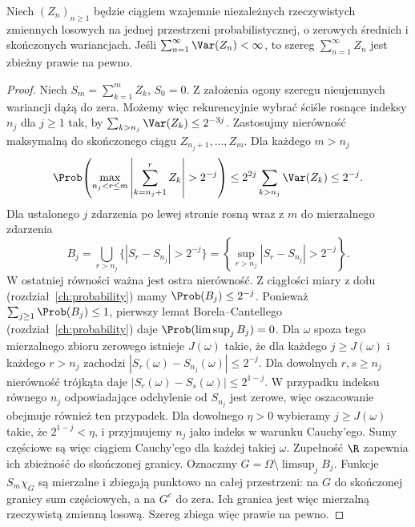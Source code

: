 \begin{lemat}
Niech $(Z_n)_{n\geq1}$ będzie ciągiem wzajemnie
niezależnych rzeczywistych zmiennych losowych na jednej
przestrzeni probabilistycznej, o zerowych średnich
i skończonych wariancjach. Jeśli $\sum_{n=1}^\infty\Var(Z_n)<\infty$,
to szereg $\sum_{n=1}^\infty Z_n$ jest zbieżny
prawie na pewno.
\end{lemat}
\begin{proof}
Niech $S_m=\sum_{k=1}^m Z_k$, $S_0=0$.
Z założenia ogony szeregu nieujemnych wariancji
dążą do zera. Możemy więc rekurencyjnie wybrać
ściśle rosnące indeksy $n_j$ dla $j\geq1$ tak, by
$\sum_{k>n_j}\Var(Z_k)\leq2^{-3j}$.
Zastosujmy nierówność maksymalną do skończonego
ciągu $Z_{n_j+1},\ldots,Z_m$. Dla każdego $m>n_j$
\[
\Prob\!\left(\max_{n_j<r\leq m}
\left|\sum_{k=n_j+1}^rZ_k\right|>2^{-j}\right)
\leq 2^{2j}\sum_{k>n_j}\Var(Z_k)\leq2^{-j}.
\]
Dla ustalonego $j$ zdarzenia po lewej stronie
rosną wraz z $m$ do mierzalnego zdarzenia
\[
B_j=\bigcup_{r>n_j}\{|S_r-S_{n_j}|>2^{-j}\}
=\left\{\sup_{r>n_j}|S_r-S_{n_j}|>2^{-j}\right\}.
\]
W ostatniej równości ważna jest ostra nierówność.
Z ciągłości miary z dołu (rozdział~\ref{ch:probability})
mamy $\Prob(B_j)\leq2^{-j}$.
Ponieważ $\sum_{j\geq1}\Prob(B_j)\leq1$, pierwszy
lemat Borela--Cantellego (rozdział~\ref{ch:probability})
daje $\Prob(\limsup_j B_j)=0$.
Dla $\omega$ spoza tego mierzalnego zbioru zerowego
istnieje $J(\omega)$ takie, że dla każdego $j\geq J(\omega)$
i każdego $r>n_j$ zachodzi
$|S_r(\omega)-S_{n_j}(\omega)|\leq2^{-j}$.
Dla dowolnych $r,s\geq n_j$ nierówność trójkąta daje
$|S_r(\omega)-S_s(\omega)|\leq2^{1-j}$.
W przypadku indeksu równego $n_j$ odpowiadające
odchylenie od $S_{n_j}$ jest zerowe, więc oszacowanie
obejmuje również ten przypadek.
Dla dowolnego $\eta>0$ wybieramy $j\geq J(\omega)$
takie, że $2^{1-j}<\eta$, i przyjmujemy $n_j$ jako
indeks w warunku Cauchy'ego. Sumy częściowe są więc
ciągiem Cauchy'ego dla każdej takiej $\omega$. Zupełność $\R$
zapewnia ich zbieżność do skończonej granicy.
Oznaczmy $G=\Omega\setminus\limsup_j B_j$.
Funkcje $S_m\chi_G$ są mierzalne i zbiegają punktowo
na całej przestrzeni: na $G$ do skończonej granicy
sum częściowych, a na $G^c$ do zera. Ich granica
jest więc mierzalną rzeczywistą zmienną losową.
Szereg zbiega więc prawie na pewno.
\end{proof}

